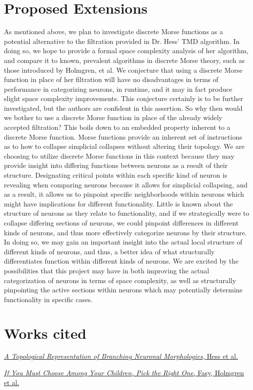 \documentclass[11pt]{article}
\begin{document}
\section*{Proposed Extensions}
As mentioned above, we plan to investigate discrete Morse functions as a potential alternative to the filtration provided in Dr. Hess' TMD algorithm. In doing so, we hope to provide a formal space complexity analysis
of her algorithm, and compare it to known, prevalent algorithms in discrete Morse theory, such as those introduced by Holmgren, et al. We conjecture that using a discrete Morse function in place of her filtration will have
no disadvantages in terms of performance in categorizing neurons, in runtime, and it may in fact produce slight space complexity improvements. This conjecture certainly is to be further investigated, but the authors
are confident in this assertion. So why then would we bother to use a discrete Morse function in place of the already widely accepted filtration? This boils down to an embedded property inherent to a discrete Morse 
function. Morse functions provide an inherent set of instructions as to how to collapse simplicial collapses without altering their topology. We are choosing to utilize discrete Morse functions in this context because they 
may provide insight into differing functions between neurons as a result of their structure. Designating critical points within each specific kind of neuron is revealing when comparing neurons because it allows for simplicial 
collapsing, and as a result, it allows us
to pinpoint specific neighborhoods within neurons which might have implications for different functionality. Little is known about the structure of neurons as they relate to functionality, and if we strategically were to collapse differing
sections of neurons, we could pinpoint differences in different kinds of neurons, and thus more effectively categorize neurons by their structure.
In doing so, we may gain an important insight into the actual local structure of different kinds of neurons, and thus, a better
idea of what structurally differentiates function within different kinds of neurons. We are excited by the possibilities that this project may have in both improving the actual categorization of neurons in terms of space complexity,
as well as structurally pinpointing the active sections within neurons which may potentially determine functionality in specific cases. 

\section*{Works cited}
\href{hess.pdf}{\textit{A Topological Representation of Branching Neuronal Morphologies}, Hess et al.}

\href{cccg20.pdf}{\textit{If You Must Choose Among Your Children, Pick the Right One}, Fasy, Holmgren et al.}
\end{document}
